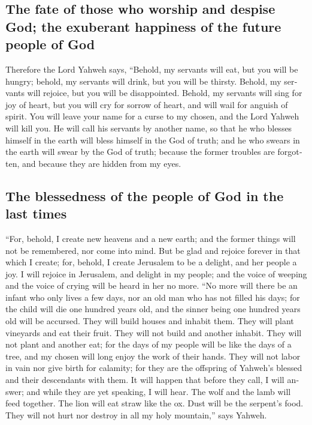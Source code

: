 \begin{paracol}{2}
\begin{otherlanguage}{english}
\hypertarget{the-fate-of-those-who-worship-and-despise-god-the-exuberant-happiness-of-the-future-people-of-god}{%
\subsection{The fate of those who worship and despise God; the exuberant
happiness of the future people of
God}\label{the-fate-of-those-who-worship-and-despise-god-the-exuberant-happiness-of-the-future-people-of-god}}

 Therefore the Lord Yahweh says, ``Behold, my servants
will eat, but you will be hungry; behold, my servants will drink, but
you will be thirsty. Behold, my servants will rejoice, but you will be
disappointed.  Behold, my servants will sing for joy of
heart, but you will cry for sorrow of heart, and will wail for anguish
of spirit.  You will leave your name for a curse to my
chosen, and the Lord Yahweh will kill you. He will call his servants by
another name,  so that he who blesses himself in the
earth will bless himself in the God of truth; and he who swears in the
earth will swear by the God of truth; because the former troubles are
forgotten, and because they are hidden from my eyes.

\hypertarget{the-blessedness-of-the-people-of-god-in-the-last-times}{%
\subsection{The blessedness of the people of God in the last
times}\label{the-blessedness-of-the-people-of-god-in-the-last-times}}

 ``For, behold, I create new heavens and a new earth; and
the former things will not be remembered, nor come into mind.
 But be glad and rejoice forever in that which I create;
for, behold, I create Jerusalem to be a delight, and her people a joy.
 I will rejoice in Jerusalem, and delight in my people;
and the voice of weeping and the voice of crying will be heard in her no
more.  ``No more will there be an infant who only lives a
few days, nor an old man who has not filled his days; for the child will
die one hundred years old, and the sinner being one hundred years old
will be accursed.  They will build houses and inhabit
them. They will plant vineyards and eat their fruit. 
They will not build and another inhabit. They will not plant and another
eat; for the days of my people will be like the days of a tree, and my
chosen will long enjoy the work of their hands.  They
will not labor in vain nor give birth for calamity; for they are the
offspring of Yahweh's blessed and their descendants with them.
 It will happen that before they call, I will answer; and
while they are yet speaking, I will hear.  The wolf and
the lamb will feed together. The lion will eat straw like the ox. Dust
will be the serpent's food. They will not hurt nor destroy in all my
holy mountain,'' says Yahweh.


\end{otherlanguage}
\end{paracol}
